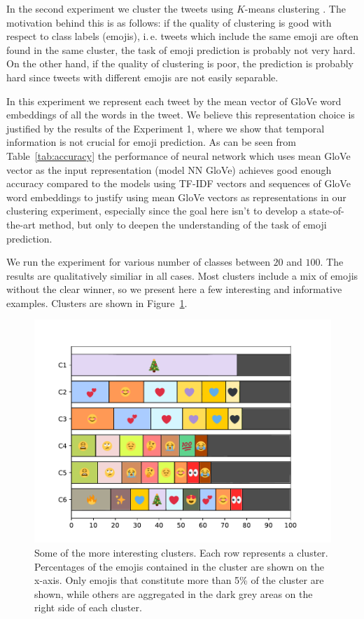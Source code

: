 \documentclass[10pt, a4paper]{article}
\begin{document}
In the second experiment we cluster the tweets using $K$-means clustering 
\citep{bishop2006pattern}. The motivation behind this is as follows: if the 
quality of clustering is good with respect to class labels (emojis), i.\,e. 
tweets which include the same emoji are often found in the same cluster, the
task of emoji prediction is probably not very hard. On the other hand, if the 
quality of clustering is poor, the prediction is probably hard since tweets with
different emojis are not easily separable.

In this experiment we represent each tweet by the mean vector of GloVe word 
embeddings of all the words in the tweet. We believe this representation choice 
is justified by the results of the Experiment 1, where we show that temporal 
information is not crucial for emoji prediction. As can be seen from 
Table~\ref{tab:accuracy} the performance of neural network which uses mean GloVe 
vector as the input representation (model NN GloVe) achieves good enough 
accuracy compared to the models using TF-IDF vectors and sequences of GloVe word
embeddings to justify using mean GloVe vectors as representations in our 
clustering experiment, especially since the goal here isn't to develop a 
state-of-the-art method, but only to deepen the understanding of the task of 
emoji prediction.

We run the experiment for various number of classes between $20$ and $100$.
The results are qualitatively similiar in all cases. Most clusters include a 
mix of emojis without the clear winner, so we present here a few interesting and
informative examples. Clusters are shown in Figure~\ref{fig:clusters}.

\begin{figure}
\begin{center}
\includegraphics[width=\columnwidth]{img/clusters.pdf}
\caption{Some of the more interesting clusters. Each row represents a cluster. 
Percentages of the emojis contained in the cluster are shown on the x-axis. Only
emojis that constitute more than 5\% of the cluster are shown, while others are 
aggregated in the dark grey areas on the right side of each cluster.}
\label{fig:clusters}
\end{center}
\end{figure}
\end{document}
